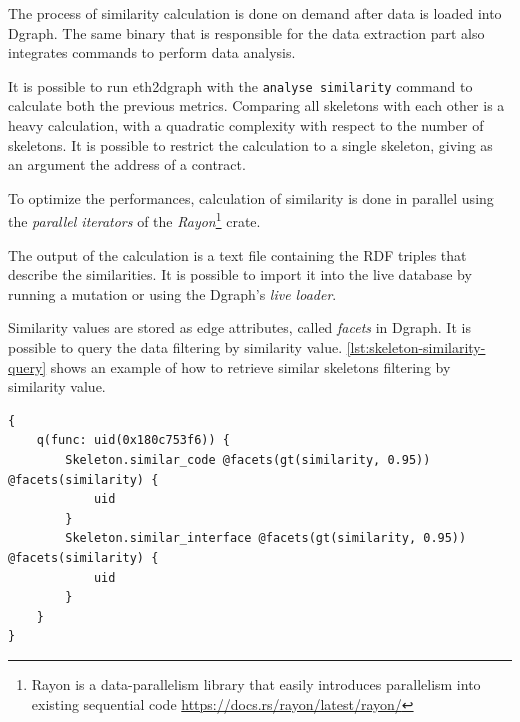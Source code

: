 The process of similarity calculation is done on demand after data is loaded into Dgraph. The same binary that is responsible for the data extraction part also integrates commands to perform data analysis. 

It is possible to run eth2dgraph with the \texttt{analyse similarity} command to calculate both the previous metrics. Comparing all skeletons with each other is a heavy calculation, with a quadratic complexity with respect to the number of skeletons. It is possible to restrict the calculation to a single skeleton, giving as an argument the address of a contract.

To optimize the performances, calculation of similarity is done in parallel using the \textit{parallel iterators} of the \textit{Rayon}\footnote{Rayon is a data-parallelism library that easily introduces parallelism into existing sequential code  \url{https://docs.rs/rayon/latest/rayon/}} crate.

The output of the calculation is a text file containing the RDF triples that describe the similarities. It is possible to import it into the live database by running a mutation or using the Dgraph's \textit{live loader}.

Similarity values are stored as edge attributes, called \textit{facets} in Dgraph. It is possible to query the data filtering by similarity value. \cref{lst:skeleton-similarity-query} shows an example of how to retrieve similar skeletons filtering by similarity value.

\begin{lstlisting}[caption={Example DQL query for getting similar skeletons.},label={lst:skeleton-similarity-query},captionpos=b]
{
    q(func: uid(0x180c753f6)) {
        Skeleton.similar_code @facets(gt(similarity, 0.95)) @facets(similarity) {
            uid
        }
        Skeleton.similar_interface @facets(gt(similarity, 0.95)) @facets(similarity) {
            uid
        }
    }
}
\end{lstlisting}